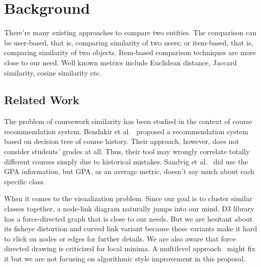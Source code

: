 \section{Background}
\label{sec:background}

There're many existing approaches to compare two entities. The comparison can be user-based, that is, comparing similarity of two users; or item-based, that is, comparing similarity of two objects. Item-based comparison techniques are more close to our need. Well known metrics include Euclidean distance, Jaccard similarity, cosine similarity etc.

\subsection{Related Work}
\label{sec:related}

The problem of coursework similarity has been studied in the context of course recommendation system. Bendakir et al.~\cite{bendakir2006using} proposed a recommendation system based on decision tree of course history. Their approach, however, does not consider students' grades at all. Thus, their tool may wrongly correlate totally different courses simply due to historical mistakes. Sandvig et al.~\cite{sandvig2005aacorn} did use the GPA information, but GPA, as an average metric, doesn't say much about each specific class. 

When it comes to the visualization problem. Since our goal is to cluster similar classes together, a node-link diagram naturally jumps into our mind. D3 library has a force-directed graph that is close to our needs. But we are hesitant about its fisheye distortion and curved link variant because these variants make it hard to click on nodes or edges for further details. We are also aware that force directed drawing is criticized for local minima. A multilevel approach~\cite{walshaw2000multilevel} might fix it but we are not focusing on algorithmic style improvement in this proposal.

